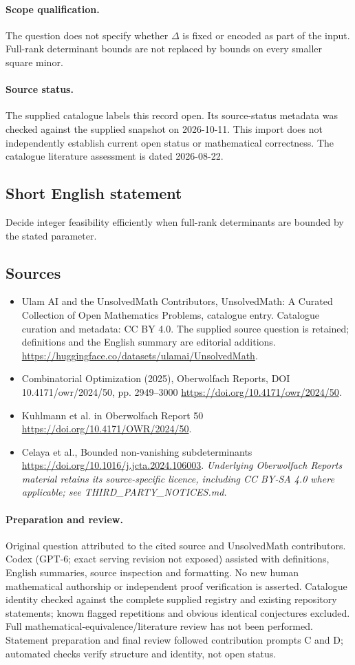 \documentclass[11pt]{article}
\begin{document}
\paragraph{Scope qualification.}
The question does not specify whether $\Delta$ is fixed or encoded as part of the input. Full-rank determinant bounds are not replaced by bounds on every smaller square minor.
\paragraph{Source status.}
The supplied catalogue labels this record open. Its source-status metadata was checked against the supplied snapshot on 2026-10-11. This import does not independently establish current open status or mathematical correctness. The catalogue literature assessment is dated 2026-08-22.
\subsection{Short English statement}
Decide integer feasibility efficiently when full-rank determinants are bounded by the stated parameter.
\subsection{Sources}
\begin{itemize}
\item[S1] Ulam AI and the UnsolvedMath Contributors, UnsolvedMath: A Curated Collection of Open Mathematics Problems, catalogue entry. Catalogue curation and metadata: CC BY 4.0. The supplied source question is retained; definitions and the English summary are editorial additions.
\url{https://huggingface.co/datasets/ulamai/UnsolvedMath}.
\item[S2] Combinatorial Optimization (2025), Oberwolfach Reports, DOI 10.4171/owr/2024/50, pp. 2949--3000
\url{https://doi.org/10.4171/owr/2024/50}.
\item[S3] Kuhlmann et al. in Oberwolfach Report 50
\url{https://doi.org/10.4171/OWR/2024/50}.
\item[S4] Celaya et al., Bounded non-vanishing subdeterminants
\url{https://doi.org/10.1016/j.jcta.2024.106003}.
\textit{Underlying Oberwolfach Reports material retains its source-specific licence, including CC BY-SA 4.0 where applicable; see THIRD\_PARTY\_NOTICES.md.}
\end{itemize}
\paragraph{Preparation and review.}
Original question attributed to the cited source and UnsolvedMath contributors. Codex (GPT-6; exact serving revision not exposed) assisted with definitions, English summaries, source inspection and formatting. No new human mathematical authorship or independent proof verification is asserted. Catalogue identity checked against the complete supplied registry and existing repository statements; known flagged repetitions and obvious identical conjectures excluded. Full mathematical-equivalence/literature review has not been performed. Statement preparation and final review followed contribution prompts C and D; automated checks verify structure and identity, not open status.
\label{end:statement}
\end{document}

